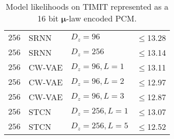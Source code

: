 {\begin{table}[p]
{\begin{tabular}{ll|lr}
        $256$     & SRNN                & $D_z=96$              & $\leq$13.28 \\
        $256$     & SRNN                & $D_z=256$             & $\leq$13.14 \\
        $256$     & CW-VAE              & $D_z=96, L=1$         & $\leq$13.11 \\
        $256$     & CW-VAE              & $D_z=96, L=2$         & $\leq$12.97 \\
        $256$     & CW-VAE              & $D_z=96, L=3$         & $\leq$12.87 \\
        $256$     & STCN                & $D_z=256,L=1$         & $\leq$13.07 \\  %
        $256$     & STCN                & $D_z=256,L=5$         & $\leq$12.52 \\
        \bottomrule
    \end{tabular}%
    }
    \caption[Model likelihoods on TIMIT represented as a 16 bit $\boldsymbol{\mu}$-law PCM]{
    Model likelihoods on TIMIT represented as a 16 bit $\boldsymbol{\mu}$-law encoded PCM.
    }
    \label{tab: timit likelihoods dmol mu-law appendix}
\end{table}


}

